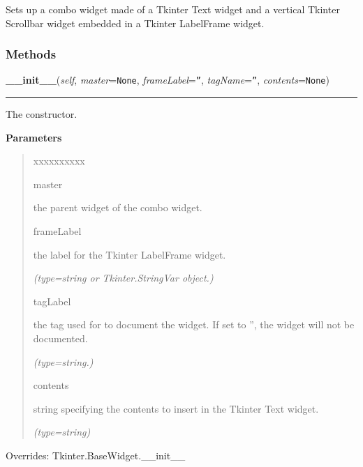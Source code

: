 Sets up a combo widget made of a Tkinter Text widget and a vertical Tkinter
Scrollbar widget embedded in a Tkinter LabelFrame widget.



  \subsubsection{Methods}

    \vspace{0.5ex}

\hspace{.8\funcindent}\begin{boxedminipage}{\funcwidth}

    \raggedright \textbf{\_\_init\_\_}(\textit{self}, \textit{master}={\tt None}, \textit{frameLabel}={\tt ''}, \textit{tagName}={\tt ''}, \textit{contents}={\tt None})

    \vspace{-1.5ex}

    \rule{\textwidth}{0.5\fboxrule}
\setlength{\parskip}{2ex}
    The constructor.

\setlength{\parskip}{1ex}
      \textbf{Parameters}
      \vspace{-1ex}

      \begin{quote}
        \begin{Ventry}{xxxxxxxxxx}

          \item[master]

          the parent widget of the combo widget.

          \item[frameLabel]

          the label for the Tkinter LabelFrame widget.

            {\it (type=string or Tkinter.StringVar object.)}

          \item[tagLabel]

          the tag used for to document the widget. If set to '', the widget
          will not be documented.

            {\it (type=string.)}

          \item[contents]

          string specifying the contents to insert in the Tkinter Text 
          widget.

            {\it (type=string)}

        \end{Ventry}

      \end{quote}

      Overrides: Tkinter.BaseWidget.\_\_init\_\_

    \end{boxedminipage}

